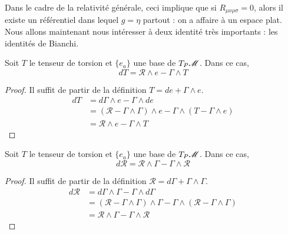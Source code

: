 \documentclass[a4paper,11pt]{report}
\begin{document}
                Dans le cadre de la relativité générale, ceci implique que si $R_{\mu\nu\rho\sigma} = 0$, alors il existe un référentiel dans lequel $g = \eta$ partout : on a affaire à un espace plat.\\
            
                Nous allons maintenant nous intéresser à deux identité très importants : les identités de Bianchi.
                
                \begin{prop}\begin{leftbar}
                    Soit $T$ le tenseur de torsion et $\{e_a\}$ une base de $T_P\mathscr{M}$. Dans ce cas,
                    \begin{equation}
                        dT = \mathscr{R} \wedge e - \Gamma\wedge T
                    \end{equation}
                \end{leftbar}\end{prop}
                
                \begin{proof}
                    Il suffit de partir de la définition $T = de+\Gamma\wedge e$.
                    \begin{align}
                        dT &= d\Gamma\wedge e - \Gamma \wedge de\\
                        &= (\mathscr{R}-\Gamma\wedge\Gamma)\wedge e-\Gamma\wedge(T-\Gamma\wedge e)\\
                        &= \mathscr{R} \wedge e - \Gamma\wedge T
                    \end{align}
                \end{proof}
                
                \begin{prop}\begin{leftbar}
                    Soit $T$ le tenseur de torsion et $\{e_a\}$ une base de $T_P\mathscr{M}$. Dans ce cas,
                    \begin{equation}
                        d\mathscr{R} = \mathscr{R} \wedge \Gamma - \Gamma\wedge \mathscr{R}
                    \end{equation}
                \end{leftbar}\end{prop}
                
                \begin{proof}
                    Il suffit de partir de la définition $\mathscr{R} = d\Gamma+\Gamma\wedge\Gamma$.
                    \begin{align}
                        d\mathscr{R} &= d\Gamma\wedge\Gamma-\Gamma\wedge d\Gamma\\
                        &= (\mathscr{R}-\Gamma\wedge\Gamma)\wedge\Gamma - \Gamma\wedge(\mathscr{R}-\Gamma\wedge\Gamma)\\
                        &= \mathscr{R} \wedge \Gamma - \Gamma\wedge \mathscr{R}
                    \end{align}
                \end{proof}
                
\end{document}
